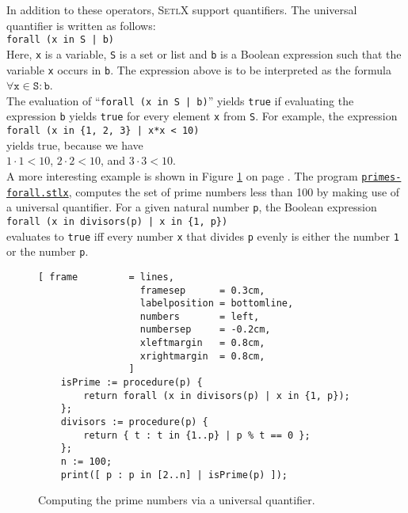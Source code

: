 In addition to these operators, \textsc{SetlX} support quantifiers.  The universal quantifier is written as
follows:
\\[0.2cm]
\hspace*{1.3cm}
\texttt{forall (x in S | b)}
\\[0.2cm]
Here, \texttt{x} is a variable, \texttt{S} is a set or list and \texttt{b} is a Boolean expression such
that the variable \texttt{x} occurs in \texttt{b}.  The expression above is to be interpreted as the formula
\\[0.2cm]
\hspace*{1.3cm}
$\forall \mathtt{x} \in \mathtt{S}: \mathtt{b}$.
\\[0.2cm]
The evaluation of ``\texttt{forall (x in S | b)}'' yields
\texttt{true} if evaluating the expression \texttt{b} yields \texttt{true} for every element \texttt{x} from
\texttt{S}.  For example, the expression
\\[0.2cm]
\hspace*{1.3cm}
\texttt{forall (x in \{1, 2, 3\} | x*x < 10)}
\\[0.2cm]
yields true, because we have
\\[0.2cm]
\hspace*{1.3cm}
$1 \cdot 1 < 10$, \quad $2 \cdot 2 < 10$, \quad and \quad $3 \cdot 3 < 10$.
\\[0.2cm]
A more interesting example is shown in Figure \ref{fig:primes-forall.stlx} on page
\pageref{fig:primes-forall.stlx}.  The program
\href{https://github.com/karlstroetmann/Logik/blob/master/SetlX/primes-forall.stlx}{\texttt{primes-forall.stlx}},
computes the set of prime numbers less than 100 by making use of a universal quantifier.
For a given natural number \texttt{p}, the Boolean expression
\\[0.2cm]
\hspace*{1.3cm}
\texttt{forall (x in divisors(p) | x in \{1, p\})}
\\[0.2cm]
evaluates to \texttt{true} iff every number \texttt{x} that divides \texttt{p} evenly is either the number
\texttt{1} or the number \texttt{p}.


\begin{figure}[!ht]
\centering
\begin{Verbatim}[ frame         = lines, 
                  framesep      = 0.3cm, 
                  labelposition = bottomline,
                  numbers       = left,
                  numbersep     = -0.2cm,
                  xleftmargin   = 0.8cm,
                  xrightmargin  = 0.8cm,
                ]
    isPrime := procedure(p) {
        return forall (x in divisors(p) | x in {1, p});
    };
    divisors := procedure(p) {
        return { t : t in {1..p} | p % t == 0 };
    };
    n := 100;
    print([ p : p in [2..n] | isPrime(p) ]);
\end{Verbatim}
\vspace*{-0.3cm}
\caption{Computing the prime numbers via a universal quantifier.}
\label{fig:primes-forall.stlx}
\end{figure}

